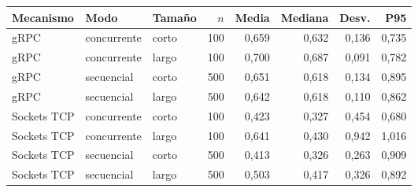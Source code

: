 \small\setlength{\tabcolsep}{4pt}
\begin{tabular}{lllrrrrr}
\toprule
Mecanismo & Modo & Tamaño & $n$ & Media & Mediana & Desv. & P95 \\
\midrule
gRPC & concurrente & corto & 100 & 0{,}659 & 0{,}632 & 0{,}136 & 0{,}735 \\
gRPC & concurrente & largo & 100 & 0{,}700 & 0{,}687 & 0{,}091 & 0{,}782 \\
gRPC & secuencial & corto & 500 & 0{,}651 & 0{,}618 & 0{,}134 & 0{,}895 \\
gRPC & secuencial & largo & 500 & 0{,}642 & 0{,}618 & 0{,}110 & 0{,}862 \\
Sockets TCP & concurrente & corto & 100 & 0{,}423 & 0{,}327 & 0{,}454 & 0{,}680 \\
Sockets TCP & concurrente & largo & 100 & 0{,}641 & 0{,}430 & 0{,}942 & 1{,}016 \\
Sockets TCP & secuencial & corto & 500 & 0{,}413 & 0{,}326 & 0{,}263 & 0{,}909 \\
Sockets TCP & secuencial & largo & 500 & 0{,}503 & 0{,}417 & 0{,}326 & 0{,}892 \\
\bottomrule
\end{tabular}
